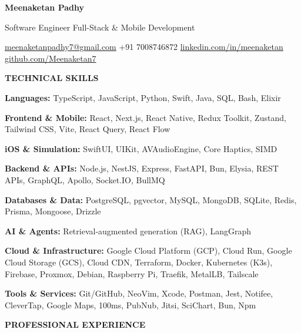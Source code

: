 \documentclass[letterpaper,10pt]{article}
\newcommand{\ressection}[1]{%
    \par\addvspace{4pt}%
    \Needspace{3\baselineskip}%
    {\fontsize{10.5pt}{11.2pt}\selectfont\bfseries #1\par}%
    \vspace{1.5pt}%
  }
\newcommand{\skill}[2]{%
    {\fontsize{9.05pt}{9.85pt}\selectfont
      \textbf{#1:} #2\par}%
  }
\begin{document}

  {\centering
    {\fontsize{17.5pt}{18.5pt}\selectfont
      \bfseries Meenaketan Padhy\par}
    \vspace{1pt}
    Software Engineer \textbar{} Full-Stack \& Mobile Development\par
    \vspace{2pt}
    {\fontsize{9pt}{10pt}\selectfont
      \href{mailto:meenaketanpadhy7@gmail.com}{meenaketanpadhy7@gmail.com}
      \enspace\textbar{}\enspace +91 7008746872
      \enspace\textbar{}\enspace
      \href{https://linkedin.com/in/meenaketan}{linkedin.com/in/meenaketan}
      \enspace\textbar{}\enspace
      \href{https://github.com/Meenaketan7}{github.com/Meenaketan7}\par}
  }


  \ressection{TECHNICAL SKILLS}

  \skill{Languages}{
    TypeScript, JavaScript, Python, Swift, Java, SQL, Bash, Elixir
  }

  \skill{Frontend \& Mobile}{
    React, Next.js, React Native, Redux Toolkit, Zustand, Tailwind CSS,
    Vite, React Query, React Flow
  }

  \skill{iOS \& Simulation}{
    SwiftUI, UIKit, AVAudioEngine, Core Haptics, SIMD
  }

  \skill{Backend \& APIs}{
    Node.js, NestJS, Express, FastAPI, Bun, Elysia, REST APIs,
    GraphQL, Apollo, Socket.IO, BullMQ
  }

  \skill{Databases \& Data}{
    PostgreSQL, pgvector, MySQL, MongoDB, SQLite, Redis, Prisma, Mongoose, Drizzle
  }

  \skill{AI \& Agents}{
    Retrieval-augmented generation (RAG), LangGraph
  }

  \skill{Cloud \& Infrastructure}{
    Google Cloud Platform (GCP), Cloud Run, Google Cloud Storage (GCS),
    Cloud CDN, Terraform, Docker, Kubernetes (K3s), Firebase, Proxmox,
    Debian, Raspberry Pi, Traefik, MetalLB, Tailscale
  }

  \skill{Tools \& Services}{
    Git/GitHub, NeoVim, Xcode, Postman, Jest, Notifee, CleverTap,
    Google Maps, 100ms, PubNub, Jitsi, SciChart, Bun, Npm
  }


  \ressection{PROFESSIONAL EXPERIENCE}
\end{document}

